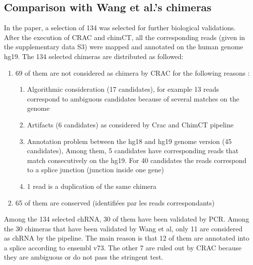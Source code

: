 \documentclass[a4paper]{article}
\begin{document}
\subsection{Comparison with Wang et al.'s chimeras}

In the paper, a selection of 134 was selected for further biological validations. After the 
execution of CRAC and chimCT, all the corresponding reads (given in 
the supplementary data S3) were mapped and annotated on the human genome hg19. The 
134 selected chimeras are distributed as followed:

\begin{enumerate}

\item  69 of them are not considered as chimera by CRAC for the following reasons :

  \begin{enumerate}

    \item Algorithmic consideration (17 candidates), for example 13 reads correspond to 
    ambiguous candidates because of several matches on the genome

    \item Artifacts (6 candidates) as considered by Crac and ChimCT pipeline

    \item Annotation problem between the hg18 and hg19 genome version (45 candidates), 
    Among them, 5 candidates have corresponding reads that match consecutively on 
    the hg19. For 40 candidates the reads correspond to a splice junction (junction inside 
    one gene) 

    \item 1 read is a duplication of the same chimera

  \end{enumerate}

\item 65 of them are conserved (identifiées par les reads correspondants)

\end{enumerate}

Among the 134 selected chRNA, 30 of them have been validated by PCR. Among the 30 
chimeras that have been validated by Wang et al, only 11 are considered as chRNA by 
the pipeline. The main reason is that 12 of them are annotated into a splice according to 
ensembl v73. The other 7 are ruled out by CRAC because they are ambiguous or do not pass 
the stringent test.
\end{document}
